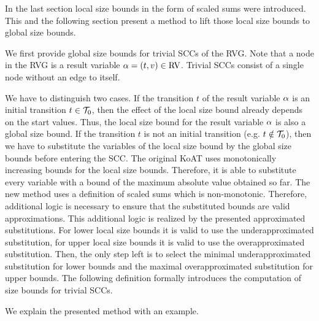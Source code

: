 In the last section local size bounds in the form of scaled sums were introduced.
This and the following section present a method to lift those local size bounds to global size bounds.

We first provide global size bounds for trivial SCCs of the RVG.
Note that a node in the RVG is a result variable $\alpha = (t,v) \in \text{RV}$.
Trivial SCCs consist of a single node without an edge to itself.

We have to distinguish two cases.
If the transition $t$ of the result variable $\alpha$ is an initial transition $t \in \mathcal{T}_0$, then the effect of the local size bound already depends on the start values.
Thus, the local size bound for the result variable $\alpha$ is also a global size bound.
If the transition $t$ is not an initial transition (e.g. $t \notin \mathcal{T}_0$), then we have to substitute the variables of the local size bound by the global size bounds before entering the SCC.
The original KoAT uses monotonically increasing bounds for the local size bounds.
Therefore, it is able to substitute every variable with a bound of the maximum absolute value obtained so far.
The new method uses a definition of scaled sums which is non-monotonic.
Therefore, additional logic is necessary to ensure that the substituted bounds are valid approximations.
This additional logic is realized by the presented approximated substitutions.
For lower local size bounds it is valid to use the underapproximated substitution, for upper local size bounds it is valid to use the overapproximated substitution.
Then, the only step left is to select the minimal underapproximated substitution for lower bounds and the maximal overapproximated substitution for upper bounds.
The following definition formally introduces the computation of size bounds for trivial SCCs.



We explain the presented method with an example.

